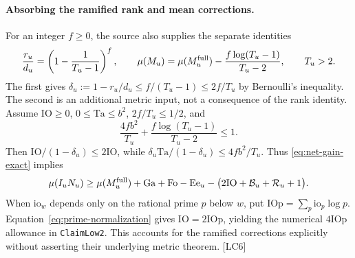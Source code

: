 \paragraph{Absorbing the ramified rank and mean corrections.}
For an integer $f\ge0$, the source also supplies the separate identities
\[
\frac{r_u}{d_u}=\left(1-\frac1{T_u-1}\right)^f,
\qquad
\mu(M_u)=\mu(M_u^{\rm full})-
\frac{f\log(T_u-1)}{T_u-2},\qquad T_u>2.
\]
The first gives $\delta_u:=1-r_u/d_u\le f/(T_u-1)\le2f/T_u$ by Bernoulli's inequality. The second is an additional metric input, not a consequence of the rank identity. Assume $\mathrm{IO}\ge0$, $0\le\mathrm{Ta}\le b^2$, $2f/T_u\le1/2$, and
\[
\frac{4fb^2}{T_u}+\frac{f\log(T_u-1)}{T_u-2}\le1.
\]
Then $\mathrm{IO}/(1-\delta_u)\le2\mathrm{IO}$, while
$\delta_u\mathrm{Ta}/(1-\delta_u)\le4fb^2/T_u$.
Thus \eqref{eq:net-gain-exact} implies
\[
\mu(I_uN_u)\ge\mu(M_u^{\rm full})+\mathrm{Ga}+\mathrm{Fo}-\mathrm{Ee}_u
-\bigl(2\mathrm{IO}+\mathcal B_u+\mathcal R_u+1\bigr).
\]
When $\mathrm{io}_w$ depends only on the rational prime $p$ below $w$, put $\mathrm{IOp}=\sum_p\mathrm{io}_p\log p$. Equation~\eqref{eq:prime-normalization} gives $\mathrm{IO}=2\mathrm{IOp}$, yielding the numerical $4\mathrm{IOp}$ allowance in \texttt{ClaimLow2}. This accounts for the ramified corrections explicitly without asserting their underlying metric theorem. \textsf{[LC6]}
